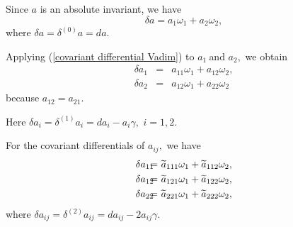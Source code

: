 \documentclass{article}
\begin{document}
Since $a$ is an absolute invariant, we have
\begin{equation*}
\delta a=a_{1}\omega _{1}+a_{2}\omega _{2},
\end{equation*}%
where $\delta a=\delta ^{(0)}a=da.$

Applying (\ref{covariant differential Vadim}) to $a_{1}\ $and $a_{2},$ we
obtain
\begin{eqnarray*}
\delta a_{1} &\!\!\!\!=&\!\!\!\!a_{11}\omega _{1}+a_{12}\omega _{2}, \\
\delta a_{2} &\!\!\!\!=&\!\!\!\!a_{12}\omega _{1}+a_{22}\omega _{2}
\end{eqnarray*}%
because $a_{12}=a_{21}.$

Here $\delta a_{i}=\delta ^{(1)}a_{i}=da_{i}-a_{i}\gamma ,$ $i=1,2.$

For the covariant differentials of $a_{ij},$ we have
\begin{eqnarray}
\delta a_{11} &\!\!\!\!=&\!\!\!\!\widetilde{a}_{111}\omega _{1}+\widetilde{a}%
_{112}\omega _{2},  \label{2nd covariant differentials} \\
\delta a_{12} &\!\!\!\!=&\!\!\!\!\widetilde{a}_{121}\omega _{1}+\widetilde{a}%
_{122}\omega _{2},  \notag \\
\delta a_{22} &\!\!\!\!=&\!\!\!\!\widetilde{a}_{221}\omega _{1}+\widetilde{a}%
_{222}\omega _{2},  \notag
\end{eqnarray}%
where $\delta a_{ij}=\delta ^{(2)}a_{ij}=da_{ij}-2a_{ij}\gamma .$
\end{document}
